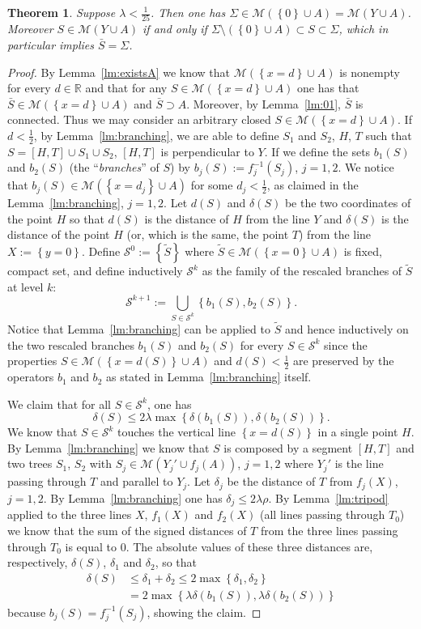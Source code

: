 \documentclass{amsart}
\newcommand{\RR}{\mathbb R}
\newcommand{\ENCLOSE}[1]{\left\{#1\right\}}
\newcommand{\M}{\mathcal{M}}
\renewcommand{\S}{\mathcal{S}}
\newtheorem{theorem}{Theorem}[section]
\theoremstyle{definition}
\theoremstyle{remark}
\begin{document}
\begin{theorem}\label{th:main}
Suppose $\lambda < \frac 1{25}$.
Then one has $\Sigma \in \M(\ENCLOSE{0}\cup A) = \M(Y\cup A)$.
Moreover $S\in \M(Y\cup A)$ if and only if 
$\Sigma\setminus (\ENCLOSE{0}\cup A)\subset S\subset \Sigma$,
which in particular implies $\bar S=\Sigma$.
\end{theorem}
%
\begin{proof}
By Lemma~\ref{lm:existsA} we know that $\M(\ENCLOSE{x=d}\cup A)$
is nonempty for every $d\in \RR$ and
that for any $S\in \M(\ENCLOSE{x=d}\cup A)$ 
one has that $\bar S\in \M(\ENCLOSE{x=d}\cup A)$ and $\bar S\supset A$.
Moreover, by Lemma~\ref{lm:01},
$\bar S$ is connected.
Thus we may consider an arbitrary closed $S\in \M(\ENCLOSE{x=d}\cup A)$.
If $d<\frac 1 2$, 
by Lemma~\ref{lm:branching}, 
we are able to define $S_1$ and $S_2$, $H$, $T$
such that 
$S=[H, T] \cup S_1 \cup S_2$, $[H,T]$ is perpendicular to $Y$.
If we define the sets $b_1(S)$ and $b_2(S)$ 
(the ``\emph{branches}'' of $S$) 
by $b_j(S) := f_j^{-1}(S_j)$, $j=1,2$.
We notice that $b_j(S)\in \M(\ENCLOSE{x=d_j}\cup A)$ for some $d_j<\frac 1 2$, 
as claimed in the Lemma~\ref{lm:branching}, $j=1,2$.
Let $d(S)$ and $\delta(S)$ be the two coordinates of the point $H$ 
so that $d(S)$ is the distance of $H$ from the line $Y$ 
and $\delta(S)$ is the distance of the point $H$
(or, which is the same, the point $T$) 
from the line $X:=\ENCLOSE{y=0}$.
Define $\S^0:=\ENCLOSE{\tilde S}$ where $\tilde S\in \M(\ENCLOSE{x=0}\cup A)$ 
is fixed, compact set,
and define inductively $\S^k$ as the family of the rescaled branches of $\tilde S$ 
at level $k$:
\[
  \S^{k+1} := \bigcup_{S\in \S^k}\ENCLOSE{b_1(S),b_2(S)}.
\]
Notice that Lemma~\ref{lm:branching} can be applied to $\tilde S$ and 
hence inductively on the two rescaled branches 
$b_1(S)$ and $b_2(S)$ for every $S\in \S^k$
since the properties 
$S \in \M(\ENCLOSE{x=d(S)}\cup A)$ and $d(S)<\frac 1 2$
are preserved by the operators $b_1$ and $b_2$
as stated in Lemma~\ref{lm:branching} itself.

We claim that for all $S\in \S^k$, one has 
\[
  \delta(S)\le 2\lambda \max\ENCLOSE{\delta(b_1(S)),
    \delta(b_2(S))}.
\]
We know that $S\in \S^k$ touches the vertical line $\ENCLOSE{x=d(S)}$ 
in a single point $H$.
By Lemma~\ref{lm:branching} we know that $S$ is composed 
by a segment $[H, T]$ and two trees $S_1$, $S_2$
with $S_j\in \M(Y_j'\cup f_j(A))$, $j=1,2$
where $Y_j'$ is the line passing through $T$ and parallel to $Y_j$.
Let $\delta_j$ be the distance of $T$ from $f_j(X)$, $j=1,2$.
By Lemma~\ref{lm:branching} one has $\delta_j \le 2\lambda\rho$.
By Lemma~\ref{lm:tripod} applied to the three lines $X$, $f_1(X)$ and $f_2(X)$
(all lines passing through $T_0$) we know that the sum of the signed distances of $T$ from the three lines 
passing through $T_0$ is equal to $0$.
The absolute values of these three distances
are, respectively, $\delta(S)$, $\delta_1$ and $\delta_2$,
so that
\begin{align*}
  \delta(S) &\le \delta_1 + \delta_2 
    \le 2\max\ENCLOSE{\delta_1,\delta_2}\\
    &= 2\max\ENCLOSE{\lambda\delta(b_1(S)),\lambda\delta(b_2(S))}
  \end{align*}
because $b_j(S)=f_j^{-1}(S_j)$,
showing the claim.


\end{proof}
\end{document}
